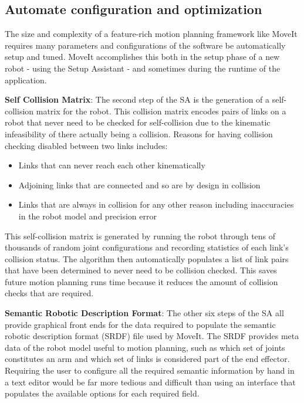 \documentclass[10pt,journal,compsoc]{joser1}
\begin{document}
{\subsection{Automate configuration and optimization}

The size and complexity of a feature-rich motion planning framework like MoveIt requires many parameters and configurations of the software be automatically setup and tuned. MoveIt accomplishes this both in the setup phase of a new robot - using the Setup Assistant - and sometimes during the runtime of the application.

{\bf Self Collision Matrix}: The second step of the SA is the generation of a self-collision matrix for the robot. This collision matrix encodes pairs of links on a robot that never need to be checked for self-collision due to the kinematic infeasibility of there actually being a collision. Reasons for having collision checking disabled between two links includes:
 
\begin{itemize}
    \item Links that can never reach each other kinematically
    \item Adjoining links that are connected and so are by design in collision
    \item Links that are always in collision for any other reason including inaccuracies in the robot model and precision error
\end{itemize}

This self-collision matrix is generated by running the robot through tens of thousands of random joint configurations and recording statistics of each link's collision status. The algorithm then automatically populates a list of link pairs that have been determined to never need to be collision checked. This saves future motion planning runs time because it reduces the amount of collision checks that are required.

{\bf Semantic Robotic Description Format}: The other six steps of the SA all provide graphical front ends for the data required to populate the semantic robotic description format (SRDF) file used by MoveIt. The SRDF provides meta data of the robot model useful to motion planning, such as which set of joints constitutes an arm and which set of links is considered part of the end effector. Requiring the user to configure all the required semantic information by hand in a text editor would be far more tedious and difficult than using an interface that populates the available options for each required field.

}
\end{document}
